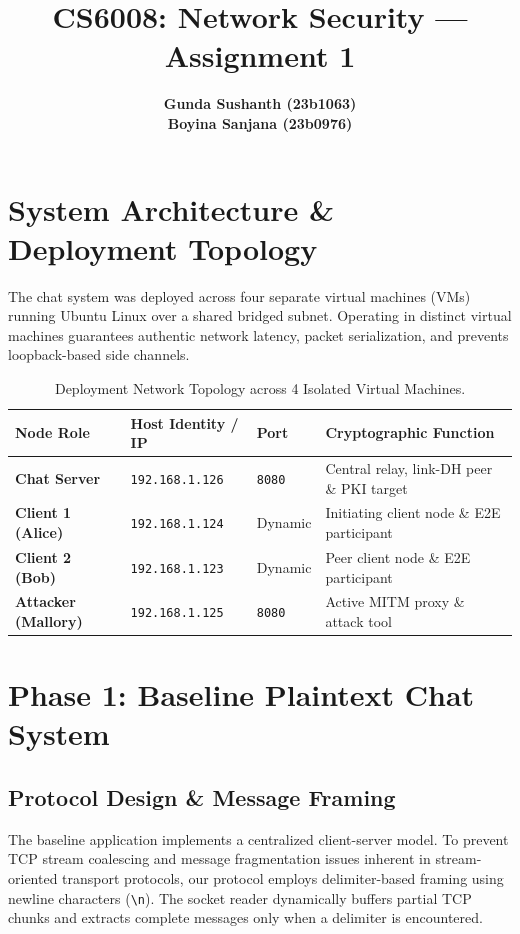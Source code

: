\documentclass[11pt,a4paper]{article}
\title{
    \vspace{-1.5em}
    \textbf{\LARGE CS6008: Network Security --- Assignment 1}\\[0.4em]
}
\author{
    \textbf{Gunda Sushanth (23b1063)} \\
    \textbf{Boyina Sanjana (23b0976)} \\
}
\date{}
\begin{document}
\maketitle

\vspace{0.5em}

\section{System Architecture \& Deployment Topology}
The chat system was deployed across four separate virtual machines (VMs) running Ubuntu Linux over a shared bridged subnet. Operating in distinct virtual machines guarantees authentic network latency, packet serialization, and prevents loopback-based side channels.

\begin{table}[H]
\centering
\small
\begin{tabular}{@{}llll@{}}
\toprule
\textbf{Node Role} & \textbf{Host Identity / IP} & \textbf{Port} & \textbf{Cryptographic Function} \\ \midrule
\textbf{Chat Server} & \texttt{192.168.1.126} & \texttt{8080} & Central relay, link-DH peer \& PKI target \\
\textbf{Client 1 (Alice)} & \texttt{192.168.1.124} & Dynamic & Initiating client node \& E2E participant \\
\textbf{Client 2 (Bob)} & \texttt{192.168.1.123} & Dynamic & Peer client node \& E2E participant \\
\textbf{Attacker (Mallory)} & \texttt{192.168.1.125} & \texttt{8080} & Active MITM proxy \& attack tool \\ \bottomrule
\end{tabular}
\caption{Deployment Network Topology across 4 Isolated Virtual Machines.}
\label{tab:topology}
\end{table}

\section{Phase 1: Baseline Plaintext Chat System}

\subsection{Protocol Design \& Message Framing}
The baseline application implements a centralized client-server model. To prevent TCP stream coalescing and message fragmentation issues inherent in stream-oriented transport protocols, our protocol employs delimiter-based framing using newline characters (\texttt{\textbackslash n}). The socket reader dynamically buffers partial TCP chunks and extracts complete messages only when a delimiter is encountered.
\end{document}
